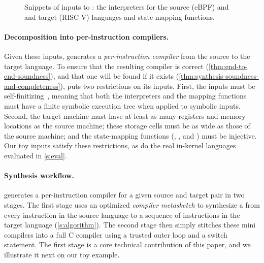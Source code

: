 \begin{figure}[h]
\centering
{}
\vspace{-.5em}
  \caption{Snippets of inputs to \jitsynth: the interpreters for the source (eBPF) and and target (RISC-V) languages and state-mapping functions.}
  \label{fig:toy-inputs}
  \end{figure}

\paragraph{Decomposition into per-instruction compilers.} 

Given these inputs, \jitsynth generates a \emph{per-instruction compiler} from
the source to the target language. To ensure that the resulting compiler is
correct (\autoref{thm:end-to-end-soundness}), and that one will be found if it
exists (\autoref{thm:synthesis-soundness-and-completeness}), \jitsynth puts two
restrictions on its inputs. First, the inputs must be
self-finitizing~\cite{torlak:rosette}, meaning that both the interpreters and
the mapping functions must have a finite symbolic execution tree when applied to
symbolic inputs.
Second, the target machine must have at least as many registers and memory
locations as the source machine; these storage cells must be as wide as those of
the source machine; and the state-mapping functions (, , and
) must be injective. Our toy inputs satisfy these restrictions, as do
the real in-kernel languages evaluated in \autoref{s:eval}.

\paragraph{Synthesis workflow.} 

\jitsynth generates a per-instruction compiler for a given source and target
pair in two stages. The first stage uses an optimized \emph{compiler metasketch}
to synthesize a \minicompiler from every instruction in the source language to a
sequence of instructions in the target language (\autoref{s:algorithm}). The
second stage then simply stitches these mini compilers into a full C compiler
using a trusted outer loop and a switch statement. The first stage is a core
technical contribution of this paper, and we illustrate it next on our toy
example.\tighten



